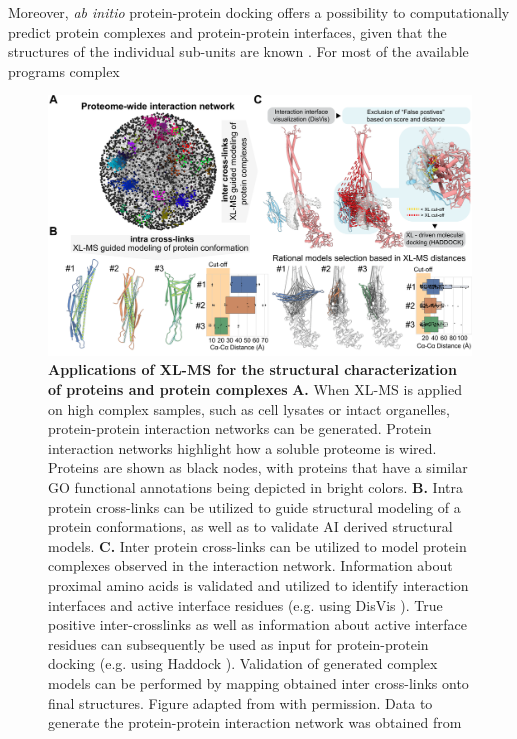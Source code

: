 Moreover, \emph{ab initio} protein-protein docking offers a possibility to computationally predict protein complexes and protein-protein interfaces, given that the structures of the individual sub-units are known \cite{Dominguez_2003, Vakser_2014}. For most of the available programs complex\\

\begin{figure}[ht!]
    \center
    \includegraphics[]{Chapter.1/Figures/Figure4.png}
    \caption{\textbf{Applications of XL-MS for the structural characterization of proteins and protein complexes} \textbf{A.} When XL-MS is applied on high complex samples, such as cell lysates or intact organelles, protein-protein interaction networks can be generated. Protein interaction networks highlight how a soluble proteome is wired. Proteins are shown as black nodes, with proteins that have a similar GO functional annotations \cite{Ashburner_2000} being depicted in bright colors. \textbf{B.} Intra protein cross-links can be utilized to guide structural modeling of a protein conformations, as well as to validate AI derived structural models. \textbf{C.} Inter protein cross-links can be utilized to model protein complexes observed in the interaction network. Information about proximal amino acids is validated and utilized to identify interaction interfaces and active interface residues (e.g. using DisVis \cite{van_Zundert_2015}). True positive inter-crosslinks as well as information about active interface residues can subsequently be used as input for protein-protein docking (e.g. using Haddock \cite{van_Zundert_2016}). Validation of generated complex models can be performed by mapping obtained inter cross-links onto final structures. Figure adapted from \cite{Lagerwaard_2022} with permission. Data to generate the protein-protein interaction network was obtained from \cite{Costanzo_2016}}
    \label{fig:fig4}
\end{figure}

